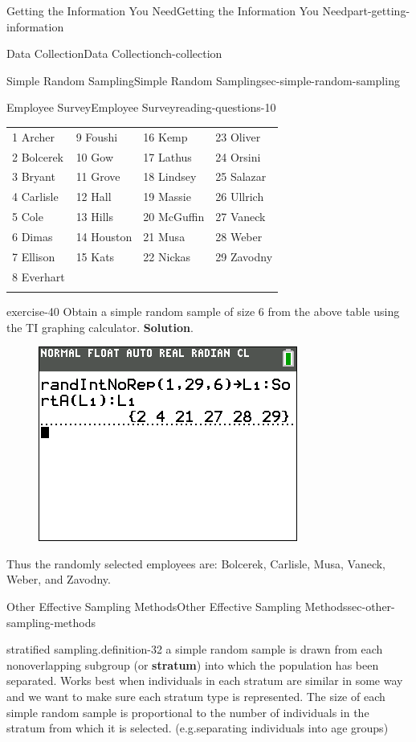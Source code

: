 \documentclass[oneside,10pt,]{book}
\newcommand{\terminology}[1]{\textbf{#1}}
\numberwithin{equation}{section}
\newcommand{\hrulethin}  {\noalign{\hrule height 0.04em}}
\newcommand{\hrulethick} {\noalign{\hrule height 0.11em}}
\begin{document}
\begin{partptx}{Getting the Information You Need}{}{Getting the Information You Need}{}{}{part-getting-information}
\begin{chapterptx}{Data Collection}{}{Data Collection}{}{}{ch-collection}
\begin{sectionptx}{Simple Random Sampling}{}{Simple Random Sampling}{}{}{sec-simple-random-sampling}
\begin{reading-questions-subsection}{Employee Survey}{}{Employee Survey}{}{}{reading-questions-10}
\begin{tabular}{llll}
1 Archer&9 Foushi&16 Kemp&23 Oliver\tabularnewline\hrulethin
2 Bolcerek&10 Gow&17 Lathus&24 Orsini\tabularnewline\hrulethin
3 Bryant&11 Grove&18 Lindsey&25 Salazar\tabularnewline\hrulethin
4 Carlisle&12 Hall&19 Massie&26 Ullrich\tabularnewline\hrulethin
5 Cole&13 Hills&20 McGuffin&27 Vaneck\tabularnewline\hrulethin
6 Dimas&14 Houston&21 Musa&28 Weber\tabularnewline\hrulethin
7 Ellison&15 Kats&22 Nickas&29 Zavodny\tabularnewline\hrulethin
8 Everhart&&&\tabularnewline\hrulethick
\end{tabular}
%
\begin{divisionexercise}{1}{}{}{exercise-40}%
Obtain a simple random sample of size 6 from the above table using the TI graphing calculator. \textbf{Solution}.\hypertarget{solution-2}{}\quad%
\begin{figure}\centering\includegraphics[width=0.4\linewidth]{images/employee-survey.png}
\end{figure} Thus the randomly selected employees are: Bolcerek, Carlisle, Musa, Vaneck, Weber, and Zavodny.\end{divisionexercise}%
\end{reading-questions-subsection}
\end{sectionptx}
%
%
\typeout{************************************************}
\typeout{************************************************}
%
\begin{sectionptx}{Other Effective Sampling Methods}{}{Other Effective Sampling Methods}{}{}{sec-other-sampling-methods}
\begin{definition}{stratified sampling.}{definition-32}%
a simple random sample is drawn from each nonoverlapping subgroup (or \terminology{stratum}) into which the population has been separated.\hypertarget{p-19}{}%
Works best when individuals in each stratum are similar in some way and we want to make sure each stratum type is represented. The size of each simple random sample is proportional to the number of individuals in the stratum from which it is selected. (e.g.\@ separating individuals into age groups)%
\end{definition}

\end{sectionptx}
\end{chapterptx}
\end{partptx}
\end{document}
